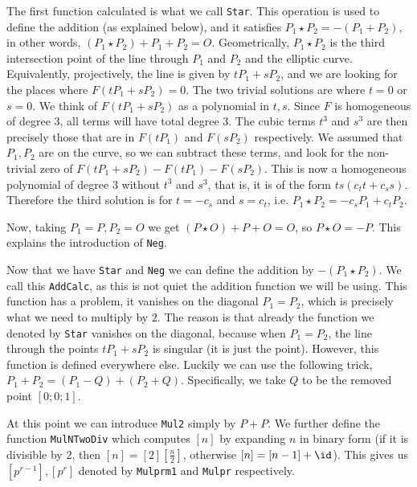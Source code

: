 The first function calculated is what we call \texttt{Star}.
This operation is used to define the addition (as explained below), and it satisfies $P_1 \star P_2 = - \left(P_1 + P_2\right)$, in other words, $\left(P_1 \star P_2\right) + P_1 + P_2 = O$.
Geometrically, $P_1 \star P_2$ is the third intersection point of the line through $P_1$ and $P_2$ and the elliptic curve.
Equivalently, projectively, the line is given by $t P_1 + s P_2$, and we are looking for the places where $F\left(t P_1 + s P_2\right) = 0$.
The two trivial solutions are where $t = 0$ or $s = 0$.
We think of $F\left(t P_1 + s P_2\right)$ as a polynomial in $t,s$.
Since $F$ is homogeneous of degree $3$, all terms will have total degree $3$.
The cubic terms $t^3$ and $s^3$ are then precisely those that are in $F\left(t P_1\right)$ and $F\left(s P_2\right)$ respectively.
We assumed that $P_1,P_2$ are on the curve, so we can subtract these terms, and look for the non-trivial zero of $F\left(t P_1 + s P_2\right) - F\left(t P_1\right) - F\left(s P_2\right)$.
This is now a homogeneous polynomial of degree $3$ without $t^3$ and $s^3$, that is, it is of the form $t s \left(c_t t + c_s s\right)$.
Therefore the third solution is for $t = -c_s$ and $s = c_t$, i.e. $P_1 \star P_2 = -c_s P_1 + c_t P_2$.

Now, taking $P_1 = P, P_2 = O$ we get $\left(P \star O\right) + P + O = O$, so $P \star O = -P$.
This explains the introduction of \texttt{Neg}.

Now that we have \texttt{Star} and \texttt{Neg} we can define the addition by $-\left(P_1 \star P_2\right)$.
We call this \texttt{AddCalc}, as this is not quiet the addition function we will be using.
This function has a problem, it vanishes on the diagonal $P_1 = P_2$, which is precisely what we need to multiply by $2$.
The reason is that already the function we denoted by \texttt{Star} vanishes on the diagonal, because when $P_1 = P_2$, the line through the points $t P_1 + s P_2$ is singular (it is just the point).
However, this function is defined everywhere else.
Luckily we can use the following trick, $P_1 + P_2 = \left(P_1 - Q\right) + \left(P_2 + Q\right)$.
Specifically, we take $Q$ to be the removed point $\left[0;0;1\right]$.

At this point we can introduce \texttt{Mul2} simply by $P+P$.
We further define the function \texttt{MulNTwoDiv} which computes $\left[n\right]$ by expanding $n$ in binary form (if it is divisible by $2$, then $\left[n\right] = \left[2\right]\left[\frac{n}{2}\right]$, otherwise $\left[n\right] = \left[n-1\right]+\id$).
This gives us $\left[p^{r-1}\right],\left[p^r\right]$ denoted by \texttt{Mulprm1} and \texttt{Mulpr} respectively.

